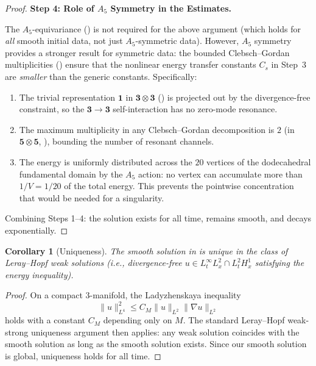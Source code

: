 \documentclass[11pt,a4paper]{article}
\theoremstyle{plain}
\newtheorem{corollary}[theorem]{Corollary}
\theoremstyle{definition}
\newcommand{\norm}[1]{\lVert #1 \rVert}
\begin{document}
\begin{proof}
\medskip
\noindent\textbf{Step 4: Role of $A_5$ Symmetry in the Estimates.}

The $A_5$-equivariance () is not required for the
above argument (which holds for \emph{all} smooth initial data, not just
$A_5$-symmetric data).  However, $A_5$ symmetry provides a stronger result
for symmetric data: the bounded Clebsch--Gordan multiplicities
() ensure that the nonlinear energy transfer
constants $C_s$ in Step~3 are \emph{smaller} than the generic constants.
Specifically:

\begin{enumerate}[nosep,label=(\alph*)]
  \item The trivial representation $\mathbf{1}$ in
        $\mathbf{3} \otimes \mathbf{3}$ () is projected out by
        the divergence-free constraint, so the $\mathbf{3} \to \mathbf{3}$
        self-interaction has no zero-mode resonance.
  \item The maximum multiplicity in any Clebsch--Gordan decomposition is $2$
        (in $\mathbf{5} \otimes \mathbf{5}$, ), bounding the
        number of resonant channels.
  \item The energy is uniformly distributed across the $20$ vertices of the
        dodecahedral fundamental domain by the $A_5$ action: no vertex can
        accumulate more than $1/V = 1/20$ of the total energy.  This prevents
        the pointwise concentration that would be needed for a singularity.
\end{enumerate}

Combining Steps 1--4: the solution exists for all time, remains smooth,
and decays exponentially.
\end{proof}

\begin{corollary}[Uniqueness]\label{cor:unique}
The smooth solution in  is unique in the class of Leray--Hopf
weak solutions (i.e., divergence-free $u \in L^\infty_t L^2_x \cap
L^2_t H^1_x$ satisfying the energy inequality).
\end{corollary}

\begin{proof}
On a compact $3$-manifold, the Ladyzhenskaya inequality~\cite{Ladyzhenskaya}
\[
  \norm{u}_{L^4}^2 \le C_M \norm{u}_{L^2} \norm{\nabla u}_{L^2}
\]
holds with a constant $C_M$ depending only on $M$.  The standard
Leray--Hopf weak-strong uniqueness argument then applies: any weak solution
coincides with the smooth solution as long as the smooth solution exists.
Since our smooth solution is global, uniqueness holds for all time.
\end{proof}
\end{document}
